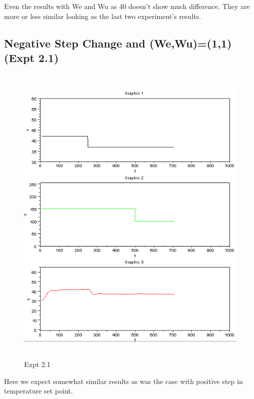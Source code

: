 Even the results with We and Wu as 40 doesn't show much difference. They are more or less similar looking as the last two experiment's results.


\subsection{Negative Step Change and (We,Wu)=(1,1) (Expt 2.1) }
\begin{figure}[H]
  \includegraphics[width=12cm, height=15cm]{mpc/2_1.PNG}
  \caption{Expt 2.1}
\end{figure}
Here we expect somewhat similar results as was the case with positive step in temperature set point.
